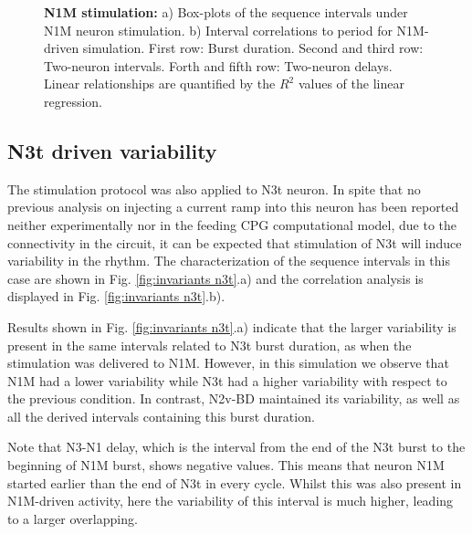 \begin{figure}[hbt!]
\begin{minipage}[b]{0.53\textwidth}
\begin{minipage}[b]{\textwidth}
		\end{minipage}
	\end{minipage}
	\caption{\textbf{N1M stimulation:} a) Box-plots of the  sequence intervals under N1M neuron stimulation. b) Interval correlations to period for N1M-driven simulation. First row: Burst duration. Second and third row: Two-neuron intervals. Forth and fifth row: Two-neuron delays. Linear relationships are quantified by the $R^2$ values of the linear regression.}
	\label{fig:invariant n1m}
\end{figure}



\subsection{N3t driven variability}
\label{subsec:n3t driven}

The stimulation protocol was also applied to N3t neuron. In spite that no previous analysis on injecting a current ramp into this neuron has been reported neither experimentally nor in the feeding CPG computational model, due to the connectivity in the circuit, it can be expected that stimulation of N3t will induce variability in the rhythm. The characterization of the sequence intervals in this case are shown in Fig. 
\ref{fig:invariants n3t}.a) and the correlation analysis is displayed in Fig. \ref{fig:invariants n3t}.b).


Results shown in Fig. \ref{fig:invariants n3t}.a) indicate that the larger variability is present in the same intervals related to N3t burst duration, as when the stimulation was delivered to N1M. However, in this simulation we observe that N1M had a lower variability while N3t had a higher variability with respect to the previous condition. 
In contrast, N2v-BD maintained its variability, as well as all the derived intervals containing this burst duration.

Note that N3-N1 delay, which is the interval from the end of the N3t burst to the beginning of N1M burst, shows negative values. This means that neuron N1M started earlier than the end of N3t in every cycle. Whilst this was also present in N1M-driven activity, here the variability of this interval is much higher, leading to a larger overlapping.

